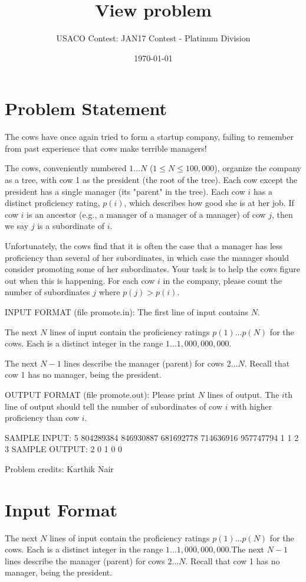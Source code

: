 \documentclass[12pt]{article}
\title{View problem}
\author{USACO Contest: JAN17 Contest - Platinum Division}
\date{\today}
\begin{document}
\maketitle

\section*{Problem Statement}

The cows have once again tried to form a startup company, failing to remember
from past experience that cows make terrible managers!

The cows, conveniently numbered $1 \ldots N$ ($1 \leq N \leq 100,000$),
organize the company as a tree, with cow 1 as the president (the root of the
tree).  Each cow except the president has a single manager (its "parent" in the
tree).  Each cow $i$ has a distinct  proficiency rating, $p(i)$, which describes
how good she is at her job.  If cow $i$ is an ancestor (e.g., a manager of a
manager of a manager) of cow $j$, then we say $j$ is a subordinate of $i$.

Unfortunately, the cows find that it is often the case that a manager has less
proficiency than several of her subordinates, in which case the manager should
consider promoting some of her subordinates.  Your task is to help the cows
figure out when this is happening.  For each cow $i$ in the company, please
count the number of subordinates $j$ where $p(j) > p(i)$.

INPUT FORMAT (file promote.in):
The first line of input contains $N$.

The next $N$ lines of input contain the proficiency ratings $p(1) \ldots p(N)$
for the cows.  Each is a distinct integer in the range $1 \ldots 1,000,000,000$.

The next $N-1$ lines describe the manager (parent) for cows $2 \ldots N$. 
Recall that cow 1 has no manager, being the president.

OUTPUT FORMAT (file promote.out):
Please print $N$ lines of output.  The $i$th line of output should tell the
number of subordinates of cow $i$ with higher proficiency than cow $i$.

SAMPLE INPUT:
5
804289384
846930887
681692778
714636916
957747794
1
1
2
3
SAMPLE OUTPUT: 
2
0
1
0
0


Problem credits: Karthik Nair



\section*{Input Format}
The next $N$ lines of input contain the proficiency ratings $p(1) \ldots p(N)$
for the cows.  Each is a distinct integer in the range $1 \ldots 1,000,000,000$.The next $N-1$ lines describe the manager (parent) for cows $2 \ldots N$. 
Recall that cow 1 has no manager, being the president.
\end{document}
